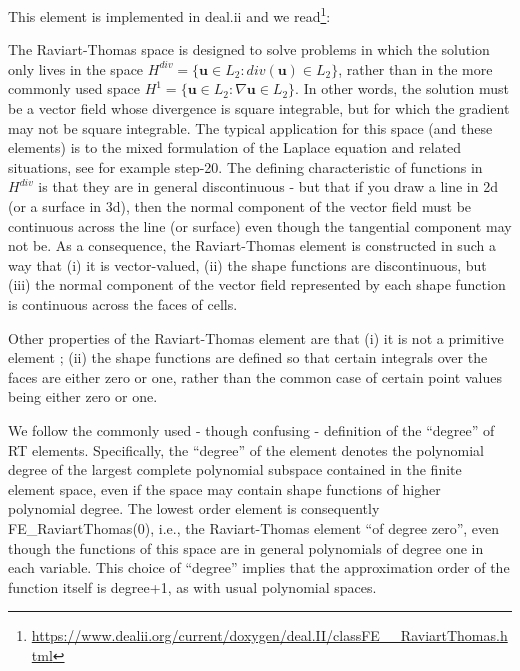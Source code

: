 
This element is implemented in deal.ii and we 
read\footnote{\url{https://www.dealii.org/current/doxygen/deal.II/classFE__RaviartThomas.html}}:
\begin{displayquote}
{\color{darkgray}
The Raviart-Thomas space is designed to solve problems in which the solution only 
lives in the space $H^{div}=\{ {\bm u} \in L_2 :div({\bm u}) \in L_2\}$, 
rather than in the more commonly used space $H^1=\{ {\bm u} \in L_2 : \nabla {\bm u} \in L_2 \}$. 
In other words, the solution must be a vector field whose divergence is square integrable, 
but for which the gradient may not be square integrable. The typical application for this space 
(and these elements) is to the mixed formulation of the Laplace equation and related situations, 
see for example step-20. The defining characteristic of functions in  $H^{div}$ is that they are 
in general discontinuous - but that if you draw a line in 2d (or a surface in 3d), 
then the normal component of the vector field must be continuous across the line (or surface) 
even though the tangential component may not be. As a consequence, the Raviart-Thomas element 
is constructed in such a way that (i) it is vector-valued, (ii) the shape functions are 
discontinuous, but (iii) the normal component of the vector field represented by each shape 
function is continuous across the faces of cells.

Other properties of the Raviart-Thomas element are that 
(i) it is not a primitive element ; 
(ii) the shape functions are defined so that certain integrals over the faces are 
either zero or one, rather than the common case of certain point values being 
either zero or one. 

We follow the commonly used - though confusing - definition of the ``degree'' of RT elements. 
Specifically, the ``degree'' of the element denotes the polynomial degree of the 
largest complete polynomial subspace contained in the finite element space, 
even if the space may contain shape functions of higher polynomial degree. 
The lowest order element is consequently FE\_RaviartThomas(0), i.e., 
the Raviart-Thomas element ``of degree zero'', even though the functions of this space 
are in general polynomials of degree one in each variable. This choice of ``degree'' 
implies that the approximation order of the function itself is degree+1, as with usual polynomial spaces. 
}
\end{displayquote}

